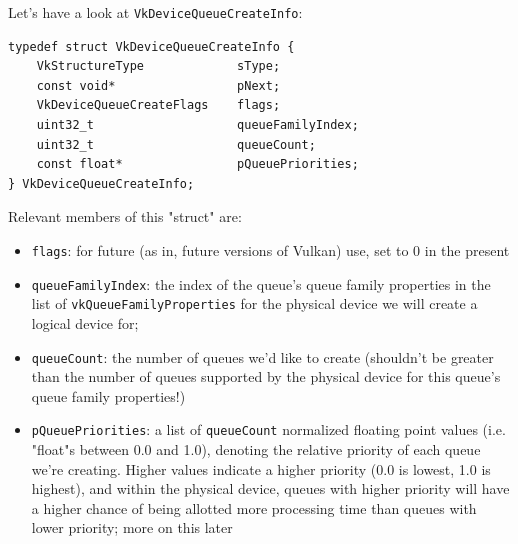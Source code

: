 \documentclass[12pt,letterpaper]{article}
\newcommand{\cil}[1]{\texttt{#1}}
\begin{document}
		Let's have a look at \cil{VkDeviceQueueCreateInfo}:
\begin{verbatim}
typedef struct VkDeviceQueueCreateInfo {
	VkStructureType             sType;
	const void*                 pNext;
	VkDeviceQueueCreateFlags    flags;
	uint32_t                    queueFamilyIndex;
	uint32_t                    queueCount;
	const float*                pQueuePriorities;
} VkDeviceQueueCreateInfo;
\end{verbatim}
		Relevant members of this "struct" are:
			\begin{itemize}
				\item \cil{flags}: for future (as in, future versions of Vulkan) use, set to 0 in the present
				
				\item \cil{queueFamilyIndex}: the index of the queue's queue family properties in the list of \cil{vkQueueFamilyProperties} for the physical device we will create a logical device for;
				
				\item \cil{queueCount}: the number of queues we'd like to create (shouldn't be greater than the number of queues supported by the physical device for this queue's queue family properties!)
				
				\item \cil{pQueuePriorities}: a list of \cil{queueCount} normalized floating point values (i.e. "float"s between 0.0 and 1.0), denoting the relative priority of each queue we're creating. Higher values indicate a higher priority (0.0 is lowest, 1.0 is highest), and within the physical device, queues with higher priority will have a higher chance of being allotted more processing time than queues with lower priority; more on this later
			\end{itemize}
		
\end{document}

